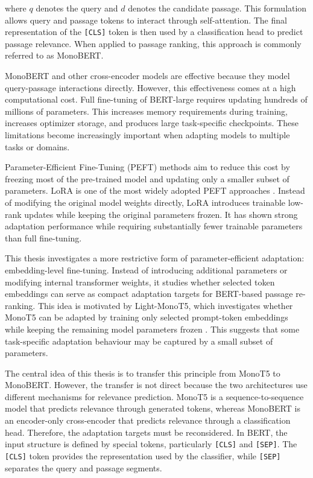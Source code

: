 where $q$ denotes the query and $d$ denotes the candidate passage. This formulation allows query and passage tokens to interact through self-attention. The final representation of the \texttt{[CLS]} token is then used by a classification head to predict passage relevance. When applied to passage ranking, this approach is commonly referred to as MonoBERT.

MonoBERT and other cross-encoder models are effective because they model query-passage interactions directly. However, this effectiveness comes at a high computational cost. Full fine-tuning of BERT-large requires updating hundreds of millions of parameters. This increases memory requirements during training, increases optimizer storage, and produces large task-specific checkpoints. These limitations become increasingly important when adapting models to multiple tasks or domains.

Parameter-Efficient Fine-Tuning (PEFT) methods aim to reduce this cost by freezing most of the pre-trained model and updating only a smaller subset of parameters. LoRA is one of the most widely adopted PEFT approaches \cite{hu2021lora}. Instead of modifying the original model weights directly, LoRA introduces trainable low-rank updates while keeping the original parameters frozen. It has shown strong adaptation performance while requiring substantially fewer trainable parameters than full fine-tuning.

This thesis investigates a more restrictive form of parameter-efficient adaptation: embedding-level fine-tuning. Instead of introducing additional parameters or modifying internal transformer weights, it studies whether selected token embeddings can serve as compact adaptation targets for BERT-based passage re-ranking. This idea is motivated by Light-MonoT5, which investigates whether MonoT5 can be adapted by training only selected prompt-token embeddings while keeping the remaining model parameters frozen \cite{braga2025monot5}. This suggests that some task-specific adaptation behaviour may be captured by a small subset of parameters.

The central idea of this thesis is to transfer this principle from MonoT5 to MonoBERT. However, the transfer is not direct because the two architectures use different mechanisms for relevance prediction. MonoT5 is a sequence-to-sequence model that predicts relevance through generated tokens, whereas MonoBERT is an encoder-only cross-encoder that predicts relevance through a classification head. Therefore, the adaptation targets must be reconsidered. In BERT, the input structure is defined by special tokens, particularly \texttt{[CLS]} and \texttt{[SEP]}. The \texttt{[CLS]} token provides the representation used by the classifier, while \texttt{[SEP]} separates the query and passage segments.


